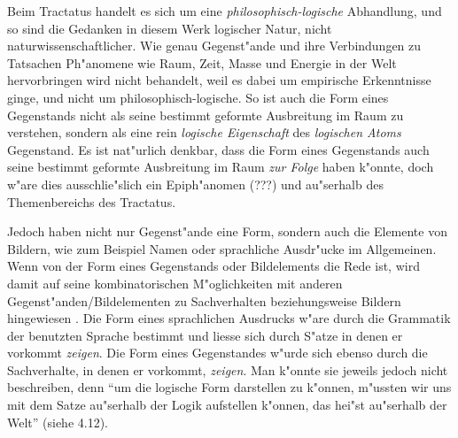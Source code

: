 \documentclass[a4paper, emulatestandardclasses, 12pt]{scrartcl}
\begin{document}
\begin{onehalfspace}
\noindent Beim Tractatus handelt es sich um eine \emph{philosophisch-logische} Abhandlung, und so sind die Gedanken in diesem Werk logischer Natur, nicht naturwissenschaftlicher. Wie genau Gegenst"ande und ihre Verbindungen zu Tatsachen Ph"anomene wie Raum, Zeit, Masse und Energie in der Welt hervorbringen wird nicht behandelt, weil es dabei um empirische Erkenntnisse ginge, und nicht um philosophisch-logische. So ist auch die Form eines Gegenstands nicht als seine bestimmt geformte Ausbreitung im Raum zu verstehen, sondern als eine rein \emph{logische Eigenschaft} des \emph{logischen Atoms} Gegenstand. Es ist nat"urlich denkbar, dass die Form eines Gegenstands auch seine bestimmt geformte Ausbreitung im Raum \emph{zur Folge} haben k"onnte, doch w"are dies ausschlie"slich ein Epiph"anomen (???) und au"serhalb des Themenbereichs des Tractatus. 

Jedoch haben nicht nur Gegenst"ande eine Form, sondern auch die Elemente von Bildern, wie zum Beispiel Namen oder sprachliche Ausdr"ucke im Allgemeinen. Wenn von der Form eines Gegenstands oder Bildelements die Rede ist, wird damit auf seine kombinatorischen M"oglichkeiten mit anderen Gegenst"anden/Bildelementen zu Sachverhalten beziehungsweise Bildern hingewiesen \cite[vgl.][S. 84]{emiliani1999formsp}. Die Form eines sprachlichen Ausdrucks w"are durch die Grammatik der benutzten Sprache bestimmt und liesse sich durch S"atze in denen er vorkommt \emph{zeigen}. Die Form eines Gegenstandes w"urde sich ebenso durch die Sachverhalte, in denen er vorkommt, \emph{zeigen}. Man k"onnte sie jeweils jedoch nicht beschreiben, denn "`um die logische Form darstellen zu k"onnen, m"ussten wir uns mit dem Satze au"serhalb der Logik aufstellen k"onnen, das hei"st au"serhalb der Welt"' (siehe 4.12). 





\end{onehalfspace}
\end{document}
